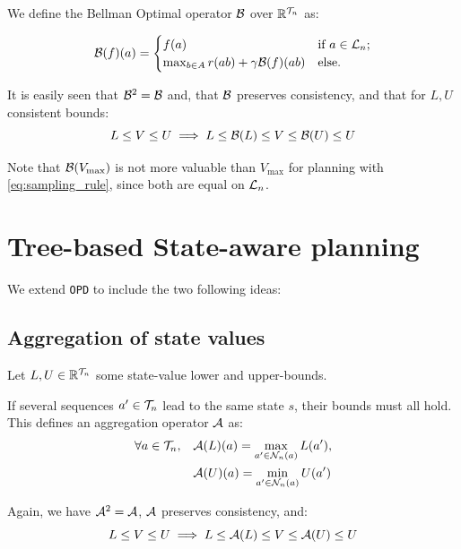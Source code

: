 \documentclass{article}
\begin{document}
\begin{definition}
We define the Bellman Optimal operator $\mathcal{B}$ over $\mathbb{R}^{\mathcal{T}_n}$ as:

\begin{equation}
    \mathcal{B}(f)(a) = \begin{cases}
    f(a) & \text{if $a\in\mathcal{L}_n$;} \\
    \max_{b\in A} r(ab) + \gamma \mathcal{B}(f)({ab})
    & \text{else.}
    \end{cases}
\end{equation}

It is easily seen that $\mathcal{B}^2=\mathcal{B}$ and, that $\mathcal{B}$ preserves consistency, and that for $L,U$ consistent bounds:
\begin{equation*}
    L\leq V \leq U \implies L \leq \mathcal{B}(L) \leq V \leq \mathcal{B}(U) \leq U
\end{equation*}

Note that $\mathcal{B}(V_{\max})$ is not more valuable than $V_{\max}$ for planning with \eqref{eq:sampling_rule}, since both are equal on $\mathcal{L}_n$.

\end{definition}

\section{Tree-based State-aware planning}

We extend \texttt{OPD} to include the two following ideas:

\subsection{Aggregation of state values}
\label{sec:aggregation}

Let $L,U\in\mathbb{R}^{\mathcal{T}_n}$ some state-value lower and upper-bounds.

\begin{definition}
If several sequences $a'\in\mathcal{T}_n$ lead to the same state $s$, their bounds must all hold. This defines an aggregation operator $\mathcal{A}$ as:
    \begin{align}
    \label{eq:aggregation}
        \forall a\in\mathcal{T}_n, \quad &\mathcal{A}(L)(a) = \max_{a'\in \mathcal{N}_n(a)} L(a'),\\
        &\mathcal{A}(U)(a) = \min_{a'\in \mathcal{N}_n(a)} U(a')                                         
    \end{align}
    
Again, we have $\mathcal{A}^2=\mathcal{A}$, $\mathcal{A}$ preserves consistency, and:
\begin{equation*}
    L\leq V \leq U \implies L\leq \mathcal{A}(L) \leq V \leq \mathcal{A}(U) \leq U
\end{equation*}
\end{definition}
\end{document}
